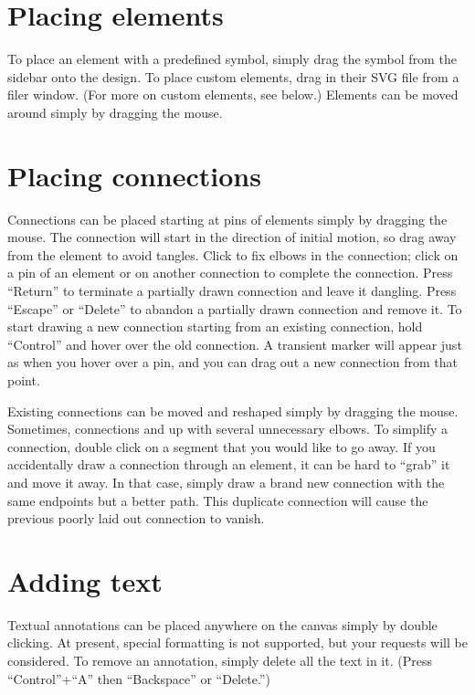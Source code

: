\documentclass[11pt]{report}
\begin{document}
\section{Placing elements}

To place an element with a predefined symbol, simply drag the symbol
from the sidebar onto the design. To place custom elements, drag in
their SVG file from a filer window. (For more on custom elements, see
below.) Elements can be moved around simply by dragging the mouse.

\section{Placing connections}

Connections can be placed starting at pins of elements simply by
dragging the mouse. The connection will start in the direction of
initial motion, so drag away from the element to avoid tangles. Click
to fix elbows in the connection; click on a pin of an element or on
another connection to complete the connection. Press ``Return'' to
terminate a partially drawn connection and leave it dangling. Press
``Escape'' or ``Delete'' to abandon a partially drawn connection and
remove it. To start drawing a new connection starting from an existing
connection, hold ``Control'' and hover over the old connection. A
transient marker will appear just as when you hover over a pin, and
you can drag out a new connection from that point.

Existing connections can be
moved and reshaped simply by dragging the mouse. Sometimes,
connections and up with several unnecessary elbows. To simplify a
connection, double click on a segment that you would like to go
away. If you accidentally draw a connection through an element, it can
be hard to ``grab'' it and move it away. In that case, simply draw a
brand new connection with the same endpoints but a better path. This
duplicate connection will cause the previous poorly laid out
connection to vanish.

\section{Adding text}

Textual annotations can be placed anywhere on the canvas simply by
double clicking. At present, special formatting is not supported, but
your requests will be considered. To remove an annotation, simply
delete all the text in it. (Press ``Control''+``A'' then ``Backspace''
or ``Delete.'')
\end{document}
